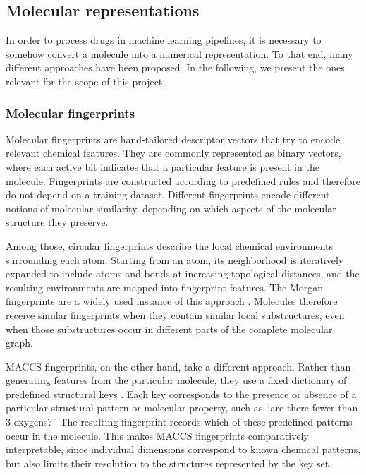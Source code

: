 \documentclass[a4paper,12pt]{article}
\begin{document}
\subsection{Molecular representations}
In order to process drugs in machine learning pipelines, it is necessary to somehow convert a molecule into a numerical representation. To that end, many different approaches have been proposed. In the following, we present the ones relevant for the scope of this project.

\subsubsection{Molecular fingerprints}

Molecular fingerprints are hand-tailored descriptor vectors that try to encode relevant
chemical features. They are commonly represented as binary vectors, where each active bit indicates that a particular feature is present in the molecule. Fingerprints are constructed according to predefined rules and therefore do not depend on a training dataset. Different fingerprints encode different notions of molecular similarity, depending on which aspects of the molecular structure they preserve.

Among those, circular fingerprints describe the local chemical environments surrounding each atom. Starting from an atom, its neighborhood is iteratively expanded to include atoms and bonds at increasing topological distances, and the resulting environments are mapped into fingerprint features. The Morgan fingerprints are a widely used instance of this approach \parencite{Rogers2010ECFP}. Molecules therefore receive similar fingerprints when they contain similar local substructures, even when those substructures occur in different parts of the complete molecular graph.

MACCS fingerprints, on the other hand, take a different approach. Rather than generating features from the particular molecule, they use a fixed dictionary of predefined structural keys \parencite{Durant2002MACCS}. Each key corresponds to the presence or absence of a particular structural pattern or molecular property, such as ``are there fewer than 3 oxygens?'' The resulting fingerprint records which of these predefined patterns occur in the molecule. This makes MACCS fingerprints comparatively interpretable, since individual dimensions correspond to known chemical patterns, but also limits their resolution to the structures represented by the key set.
\end{document}
